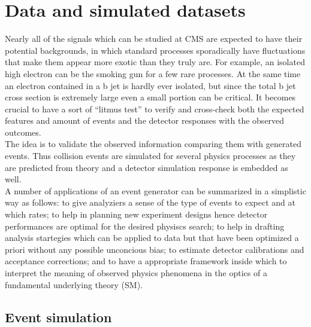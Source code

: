 \chapter{Data and simulated datasets} \label{Chapter4} 


Nearly all of the signals which can be studied at CMS are
expected to have their potential backgrounds, in which standard
processes sporadically have fluctuations that make them appear more exotic than they truly are.
For example, an isolated high \pt electron can be the smoking gun for
a few rare processes. At the same time an electron contained in a b
jet is hardly ever isolated, but since the total b jet cross section
is extremely large even a small portion can be critical. It becomes
crucial to have a sort of ``litmus test'' to verify and cross-check
both the expected features and amount of events and the detector
responses with the observed outcomes.\\
The idea is to validate the observed information comparing them with
generated events. Thus collision events are simulated for
several physics processes as they are predicted from theory and a
detector simulation response is embedded as well. \\
A number of applications of an event generator can be summarized in a
simplistic way as follows: to give analyziers a sense of the type of
events to expect and at which rates; to help in planning new
experiment designs hence detector performances are optimal for the
desired physiscs search; to help in drafting analysis startegies which
can be applied to data but that have been optimized a priori without
any possible unconcious bias; to estimate detector calibrations and acceptance
corrections; and to have a appropriate framework inside which to
interpret the meaning of observed physics phenomena in the optics of a
fundamental underlying theory (SM).



\section{Event simulation}\label{sec:c4eventsimulation}

